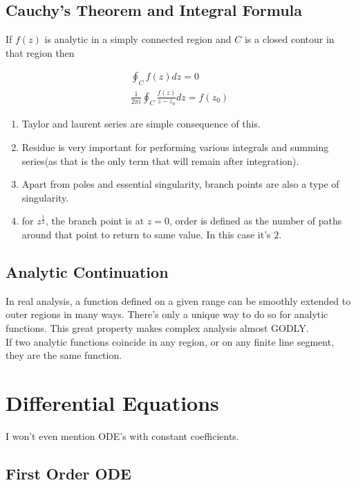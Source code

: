 \documentclass{report}
\begin{document}
\section{Cauchy's Theorem and Integral Formula} If $f(z)$ is analytic in a simply connected region and $C$ is a closed contour in that region then

\begin{gather}
\oint_{C}f(z)dz = 0\\
\frac{1}{2\pi i}\oint_{C}\frac{f(z)}{z-z_0}dz = f(z_0)
\end{gather}

\begin{enumerate}
  \item Taylor and laurent series are simple consequence of this.
  \item Residue is very important for performing various integrals and summing series(as that is the only term that will remain after integration). 
  \item Apart from poles and essential singularity, branch points are also a type of singularity.
  \item for $z^\frac{1}{2}$, the branch point is at $z=0$, order is defined as the number of paths around that point to return to same value. In this case it's $2$.
\end{enumerate}


\section{Analytic Continuation}
In real analysis, a function defined on a given range can be smoothly extended to outer regions in many ways. There's only a unique way to do so for analytic functions. This great property makes complex analysis almost GODLY.\\

\noindent If two analytic functions coincide in any region, or on any finite line segment, they are the same function.


\chapter{Differential Equations}

I won't even mention ODE's with constant coefficients.
\section{First Order ODE}
\end{document}
